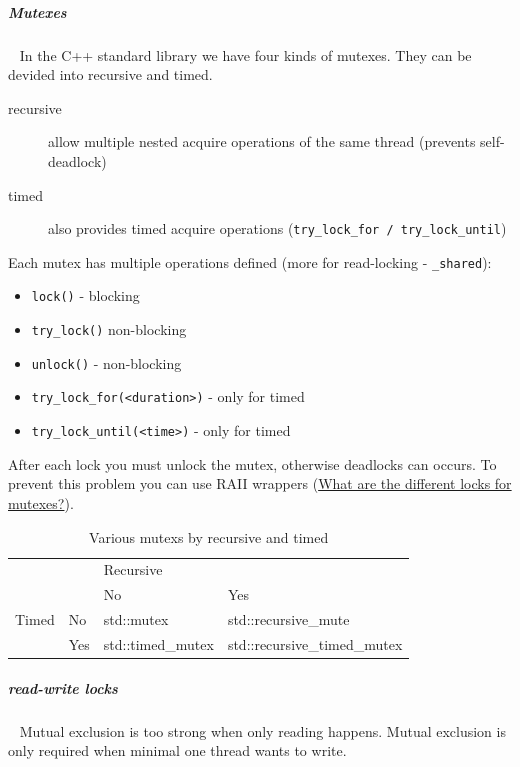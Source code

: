 \documentclass[11pt,twoside,landscape]{article}
\begin{document}
\begin{multicols}{2}
\subparagraph{Mutexes} \
\label{sec:orgefd4c48}
In the C++ standard library we have four kinds of mutexes.
They can be devided into recursive and timed.

\begin{description}
\item[{recursive}] allow multiple nested acquire operations of the same thread (prevents self-deadlock)
\item[{timed}] also provides timed acquire operations (\texttt{try\_lock\_for / try\_lock\_until})
\end{description}


Each mutex has multiple operations defined (more for read-locking - \texttt{\_shared}):
\begin{itemize}
\item \texttt{lock()} - blocking
\item \texttt{try\_lock()} non-blocking
\item \texttt{unlock()} - non-blocking
\item \texttt{try\_lock\_for(<duration>)} - only for timed
\item \texttt{try\_lock\_until(<time>)} - only for timed
\end{itemize}


After each lock you must unlock the mutex, otherwise deadlocks can occurs.
To prevent this problem you can use RAII wrappers (\href{../../../roam/20230629135006-what_are_the_different_locks_for_mutexes.org}{What are the different locks for mutexes?}).


\begin{table}[htbp]
\caption{\label{tbl:various-mutexs-by-recursive-and-timed}Various mutexs by recursive and timed}
\centering
\begin{tabular}{|l|l|l|l|}
\hline
\multicolumn{2}{|l|}{} & \multicolumn{2}{l|}{Recursive} \\
\cline{3-4}
\multicolumn{2}{|l|}{} & No & Yes \\
\hline
Timed & No & std::mutex & std::recursive\_mute \\
\cline{2-4}
 & Yes & std::timed\_mutex & std::recursive\_timed\_mutex \\
\hline
\end{tabular}
\end{table}

\subparagraph{read-write locks} \
\label{sec:org9c9218e}
Mutual exclusion is too strong when only reading happens.
Mutual exclusion is only required when minimal one thread wants to write.


\end{multicols}
\end{document}
